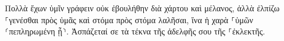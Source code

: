 \documentclass{openreader}
\begin{document}
Πολλὰ ἔχων ὑμῖν γράφειν οὐκ ἐβουλήθην διὰ χάρτου καὶ μέλανος, ἀλλὰ ἐλπίζω ⸀γενέσθαι πρὸς ὑμᾶς καὶ στόμα πρὸς στόμα λαλῆσαι, ἵνα ἡ χαρὰ ⸀ὑμῶν ⸂πεπληρωμένη ᾖ⸃. Ἀσπάζεταί σε τὰ τέκνα τῆς ἀδελφῆς σου τῆς ⸀ἐκλεκτῆς. 
\end{document}
